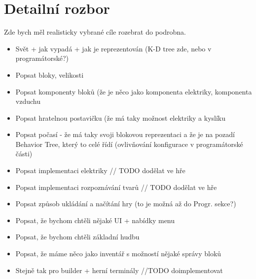 
\section{Detailní rozbor}

Zde bych měl realisticky vybrané cíle rozebrat do podrobna.

\begin{itemize}
	\item Svět + jak vypadá + jak je reprezentován (K-D tree zde, nebo v programátorské?)
	\item Popsat bloky, velikosti
	\item Popsat komponenty bloků (že je něco jako komponenta elektriky, komponenta vzduchu
	\item Popsat hratelnou postavičku (že má taky možnost elektriky a kyslíku
	\item Popsat počasí - že má taky svoji blokovou reprezentaci a že je na pozadí Behavior Tree, který to celé řídí (ovlivňování konfigurace v programátorské části)
	\item Popsat implementaci elektriky // TODO dodělat ve hře
	\item Popsat implementaci rozpoznávání tvarů // TODO dodělat ve hře
	\item Popsat způsob ukládání a načítání hry (to je možná až do Progr. sekce?)
	\item Popsat, že bychom chtěli nějaké UI + nabídky menu
	\item Popsat, že bychom chtěli základní hudbu
	\item Popsat, že máme něco jako inventář s možností nějaké správy bloků
	\item Stejně tak pro builder + herní terminály  //TODO doimplementovat
\end{itemize}
